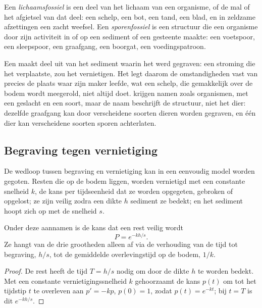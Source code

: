 \begin{definition}\label{def:b2:palaeoenvironments:fossil-kinds}
Een \emph{lichaamsfossiel} is een deel van het lichaam van een organisme, of de mal of het afgietsel
van dat deel: een schelp, een bot, een tand, een blad, en in zeldzame afzettingen een zacht weefsel. Een
\emph{sporenfossiel} is een structuur die een organisme door zijn activiteit in of
op een sediment of een gesteente maakte: een voetspoor, een sleepspoor, een graafgang, een boorgat, een voedingspatroon.
\end{definition}

Een  maakt deel uit van het sediment waarin het werd gegraven: een stroming die het verplaatste, zou het vernietigen.
Het legt daarom de omstandigheden vast van precies de plaats waar zijn maker leefde, wat een schelp,
die gemakkelijk over de bodem wordt meegerold, niet altijd doet.  krijgen namen zoals organismen, met een
geslacht en een soort, maar de naam beschrijft de structuur, niet het dier: dezelfde graafgang kan
door verscheidene soorten dieren worden gegraven, en één dier kan verscheidene soorten sporen achterlaten.

\subsection*{Begraving tegen vernietiging}

De wedloop tussen begraving en vernietiging kan in een eenvoudig model worden gegoten. Resten die op de
bodem liggen, worden vernietigd met een constante snelheid $k$, de kans per tijdseenheid dat ze worden opgegeten,
gebroken of opgelost; ze zijn veilig zodra een dikte $h$ sediment ze bedekt; en het
sediment hoopt zich op met de snelheid $s$.

\begin{proposition}\label{prop:b2:palaeoenvironments:burial}
Onder deze aannamen is de kans dat een rest veilig wordt
\[
  P = e^{-kh/s}.
\]
Ze hangt van de drie grootheden alleen af via de verhouding van de tijd tot begraving, $h/s$, tot
de gemiddelde overlevingstijd op de bodem, $1/k$.
\end{proposition}

\begin{proof}
De rest heeft de tijd $T = h/s$ nodig om door de dikte $h$ te worden bedekt. Met een constante
vernietigingssnelheid $k$ gehoorzaamt de kans $p(t)$ om tot het tijdstip $t$ te overleven aan $p' = -kp$, $p(0) =
1$, zodat $p(t) = e^{-kt}$; bij $t = T$ is dit $e^{-kh/s}$.
\end{proof}

